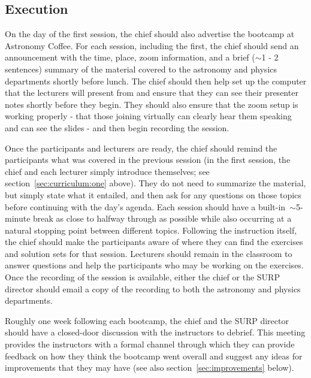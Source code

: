 \subsection{Execution}
\label{sec:timeline:execution}
\noindent
On the day of the first session, the chief should also advertise the bootcamp
at Astronomy Coffee.
For each session, including the first, the chief should send an announcement
with the time, place, zoom information, and a brief ($\sim$1 - 2
sentences) summary of the material covered to the astronomy and physics
departments shortly before lunch.
The chief should then help set up the computer that the lecturers will present
from and ensure that they can see their presenter notes shortly before they
begin.
They should also ensure that the zoom setup is working properly - that those
joining virtually can clearly hear them speaking and can see the slides - and
then begin recording the session.
\par
Once the participants and lecturers are ready, the chief should remind the
participants what was covered in the previous session (in the first session,
the chief and each lecturer simply introduce themselves; see
section~\ref{sec:curriculum:one} above).
They do not need to summarize the material, but simply state what it entailed,
and then ask for any questions on those topics before continuing with the day's
agenda.
Each session should have a built-in~$\sim$5-minute break as close to halfway
through as possible while also occurring at a natural stopping point between
different topics.
Following the instruction itself, the chief should make the participants aware
of where they can find the exercises and solution sets for that session.
Lecturers should remain in the classroom to answer questions and help the
participants who may be working on the exercises.
Once the recording of the session is available, either the chief or the SURP
director should email a copy of the recording to both the astronomy and physics
departments.
\par
Roughly one week following each bootcamp, the chief and the SURP director
should have a closed-door discussion with the instructors to debrief.
This meeting provides the instructors with a formal channel through which they
can provide feedback on how they think the bootcamp went overall and suggest
any ideas for improvements that they may have (see also
section~\ref{sec:improvements} below).

